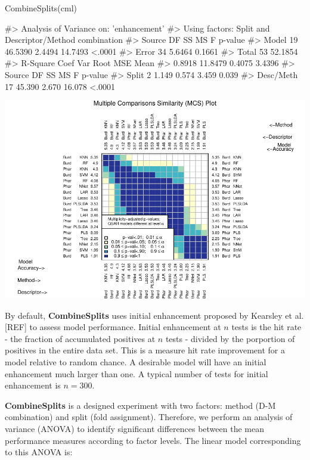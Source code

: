 \begin{Schunk}
\begin{Sinput}
CombineSplits(cml)
\end{Sinput}
\begin{Soutput}
#>    Analysis of Variance on: 'enhancement'
#>  Using factors: Split and Descriptor/Method combination
#> Source    DF        SS        MS         F   p-value   
#> Model     19   46.5390    2.4494   14.7493    <.0001   
#> Error     34    5.6464    0.1661   
#> Total     53   52.1854   
#>       R-Square   Coef Var   Root MSE       Mean   
#>         0.8918    11.8479     0.4075     3.4396   
#> Source       DF       SS       MS        F   p-value   
#> Split         2    1.149    0.574    3.459     0.039   
#> Desc/Meth    17   45.390    2.670   16.078    <.0001
\end{Soutput}

\includegraphics{chemmodlabRJournal_files/figure-latex/CombineSplits_ie-1} \end{Schunk}

By default, \textbf{CombineSplits} uses initial enhancement proposed by
Kearsley et al. {[}REF{]} to assess model performance. Initial
enhancement at \(n\) tests is the hit rate - the fraction of accumulated
positives at \(n\) tests - divided by the porportion of positives in the
entire data set. This is a measure hit rate improvement for a model
relative to random chance. A desirable model will have an initial
enhancement much larger than one. A typical number of tests for initial
enhancement is \(n=300\).

\textbf{CombineSplits} is a designed experiment with two factors: method
(D-M combination) and split (fold assignment). Therefore, we perform an
analysis of variance (ANOVA) to identify significant differences between
the mean performance measures according to factor levels. The linear
model corresponding to this ANOVA is:


